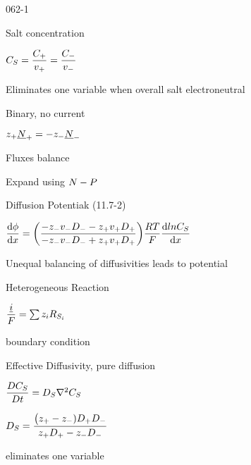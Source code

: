 \begin{mitframe}{062-1}
\begin{listone}
	\item Salt concentration
    	\begin{listtwo}
        	\item $\conc_{\entropy}=\dfrac{\conc_{+}}{\vvel_{+}}=\dfrac{\conc_{-}}{\vvel_{-}}$
            \item Eliminates one variable when overall salt electroneutral
            
        \end{listtwo}
\item Binary, no current
		\begin{listtwo}
        \item $z_{+}\uline{\nummoles}_{+}=-z_{-}\uline{\nummoles}_{-}$
        \item Fluxes balance
        \item Expand using $\nummoles-\p$
        \end{listtwo}
\item Diffusion Potentiak (11.7-2)
		\begin{listtwo}
        	\item$\dfrac{\mathrm{d}\eleccoeff}{\mathrm{d}\disp}=\bigg(\dfrac{-z_{-}\vvel_{-}\elecdisplace_{-}-z_{+}\vvel_{+}\elecdisplace_{+}}{-z_{-}\vvel_{-}\elecdisplace_{-}+z_{+}\vvel_{+}\elecdisplace_{+}}\bigg)\dfrac{\gasconst\Temp}{\force}\dfrac{\mathrm{d}ln\conc_{\entropy}}{\mathrm{d}\disp}$
            \item Unequal balancing of diffusivities leads to potential
        \end{listtwo}
\item Heterogeneous Reaction
		\begin{listtwo}
        	\item $\dfrac{\uline{\state}}{\force}=\sum\nolimits{z}_{\state}\gasconst_{\entropy_{\state}}$
            \item boundary condition
        \end{listtwo}
\item Effective Diffusivity, pure diffusion
		\begin{listtwo}
        	\item $\dfrac{\elecdisplace\conc_{\entropy}}{\elecdisplace{t}}=\elecdisplace_{\entropy}\nabla^2\conc_{\entropy}$
            \item $\elecdisplace_{\entropy}=\dfrac{\big(z_{+}-z_{-})\elecdisplace_{+}\elecdisplace_{-}}{z_{+}\elecdisplace_{+}-z_{-}\elecdisplace_{-}}$
            \item eliminates one variable
        \end{listtwo}
\end{listone}        
\end{mitframe}